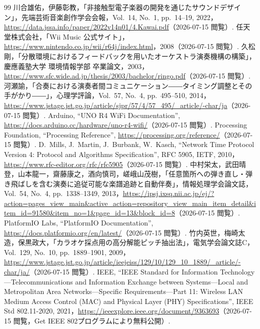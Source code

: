\documentclass[uplatex,dvipdfmx]{jlreq}
\begin{document}
\begin{thebibliography}{99}
 川合雄佑，伊藤彰教，「非接触型電子楽器の開発を通じたサウンドデザイン」，先端芸術音楽創作学会会報，Vol.~14, No.~1, pp.~14--19, 2022，\url{https://data.jssa.info/paper/2022v14n01/4.Kawai.pdf}（2026-07-15 閲覧）.
 任天堂株式会社，「Wii Music 公式サイト」，\url{https://www.nintendo.co.jp/wii/r64j/index.html}，2008（2026-07-15 閲覧）.
 久松剛，「分散環境におけるフィードバックを用いたオーケストラ演奏機構の構築」，慶應義塾大学 環境情報学部 卒業論文，2003，\url{https://www.sfc.wide.ad.jp/thesis/2003/bachelor/ringo.pdf}（2026-07-15 閲覧）.
 河瀬諭，「合奏における演奏者間コミュニケーション――タイミング調整とその手がかり――」，心理学評論，Vol.~57, No.~4, pp.~495--510, 2014，\url{https://www.jstage.jst.go.jp/article/sjpr/57/4/57_495/_article/-char/ja}（2026-07-15 閲覧）.
 Arduino, ``UNO R4 WiFi Documentation'', \url{https://docs.arduino.cc/hardware/uno-r4-wifi/}（2026-07-15 閲覧）.
 Processing Foundation, ``Processing Reference'', \url{https://processing.org/reference/}（2026-07-15 閲覧）.
 D.~Mills, J.~Martin, J.~Burbank, W.~Kasch, ``Network Time Protocol Version 4: Protocol and Algorithms Specification'', RFC 5905, IETF, 2010，\url{https://www.rfc-editor.org/rfc/rfc5905}（2026-07-15 閲覧）.
 中村栄太，武田晴登，山本龍一，齋藤康之，酒向慎司，嵯峨山茂樹，「任意箇所への弾き直し・弾き飛ばしを含む演奏に追従可能な楽譜追跡と自動伴奏」，情報処理学会論文誌，Vol.~54, No.~4, pp.~1338--1349, 2013，\url{https://ipsj.ixsq.nii.ac.jp/ej/?action=pages_view_main&active_action=repository_view_main_item_detail&item_id=91580&item_no=1&page_id=13&block_id=8}（2026-07-15 閲覧）.
 PlatformIO Labs, ``PlatformIO Documentation'', \url{https://docs.platformio.org/en/latest/}（2026-07-15 閲覧）.
 竹内英世，梅崎太造，保黒政大，「カラオケ採点用の高分解能ピッチ抽出法」，電気学会論文誌C，Vol.~129, No.~10, pp.~1889--1901, 2009，\url{https://www.jstage.jst.go.jp/article/ieejeiss/129/10/129_10_1889/_article/-char/ja/}（2026-07-15 閲覧）.
 IEEE, ``IEEE Standard for Information Technology---Telecommunications and Information Exchange between Systems---Local and Metropolitan Area Networks---Specific Requirements---Part 11: Wireless LAN Medium Access Control (MAC) and Physical Layer (PHY) Specifications'', IEEE Std 802.11-2020, 2021，\url{https://ieeexplore.ieee.org/document/9363693}（2026-07-15 閲覧，Get IEEE 802プログラムにより無料公開）.
\end{thebibliography}
\end{document}
